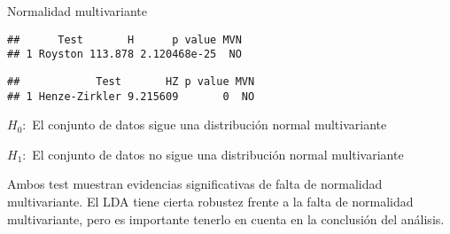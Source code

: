 \documentclass[ignorenonframetext,]{beamer}
\newenvironment{Shaded}{\begin{snugshade}}{\end{snugshade}}
\newcommand{\KeywordTok}[1]{\textcolor[rgb]{0.13,0.29,0.53}{\textbf{#1}}}
\newcommand{\DataTypeTok}[1]{\textcolor[rgb]{0.13,0.29,0.53}{#1}}
\newcommand{\DecValTok}[1]{\textcolor[rgb]{0.00,0.00,0.81}{#1}}
\newcommand{\StringTok}[1]{\textcolor[rgb]{0.31,0.60,0.02}{#1}}
\newcommand{\OperatorTok}[1]{\textcolor[rgb]{0.81,0.36,0.00}{\textbf{#1}}}
\newcommand{\NormalTok}[1]{#1}
\begin{document}
\begin{frame}[fragile]{Normalidad multivariante}

\hypertarget{left}{}
\begin{verbatim}
##      Test       H      p value MVN
## 1 Royston 113.878 2.120468e-25  NO
\end{verbatim}

\begin{verbatim}
##            Test       HZ p value MVN
## 1 Henze-Zirkler 9.215609       0  NO
\end{verbatim}

\hypertarget{right}{}
\begin{Shaded}
\end{Shaded}

\(H_0:\) El conjunto de datos sigue una distribución normal
multivariante

\(H_1:\) El conjunto de datos no sigue una distribución normal
multivariante

Ambos test muestran evidencias significativas de falta de normalidad
multivariante. El LDA tiene cierta robustez frente a la falta de
normalidad multivariante, pero es importante tenerlo en cuenta en la
conclusión del análisis.

\end{frame}
\end{document}
